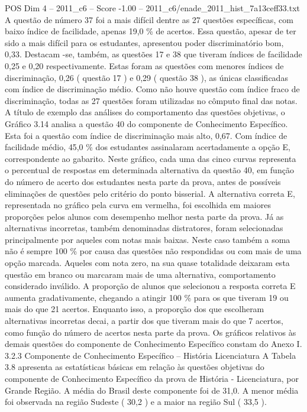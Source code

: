\begin{textsample}{POS Dim 4 – 2011\_c6 – Score -1.00 – 2011\_c6/enade\_2011\_hist\_7a13ceff33.txt}
A questão de número 37 foi a mais difícil dentre as 27 questões específicas, com baixo índice de facilidade, apenas 19,0 \% de acertos.
Essa questão, apesar de ter sido a mais difícil para os estudantes, apresentou poder discriminatório bom, 0,33.
Destacam -se, também, as questões 17 e 38 que tiveram índices de facilidade 0,25 e 0,20 respectivamente.
Estas foram as questões com menores índices de discriminação, 0,26 ( questão 17 ) e 0,29 ( questão 38 ), as únicas classificadas com índice de discriminação médio.
Como não houve questão com índice fraco de discriminação, todas as 27 questões foram utilizadas no cômputo final das notas.
A título de exemplo das análises do comportamento das questões objetivas, o Gráfico 3.14 analisa a questão 40 do componente de Conhecimento Específico.
Esta foi a questão com índice de discriminação mais alto, 0,67.
Com índice de facilidade médio, 45,0 \% dos estudantes assinalaram acertadamente a opção E, correspondente ao gabarito.
Neste gráfico, cada uma das cinco curvas representa o percentual de respostas em determinada alternativa da questão 40, em função do número de acerto dos estudantes nesta parte da prova, antes de possíveis eliminações de questões pelo critério do ponto bisserial.
A alternativa correta E, representada no gráfico pela curva em vermelha, foi escolhida em maiores proporções pelos alunos com desempenho melhor nesta parte da prova.
Já as alternativas incorretas, também denominadas distratores, foram selecionadas principalmente por aqueles com notas mais baixas.
Neste caso também a soma não é sempre 100 \% por causa das questões não respondidas ou com mais de uma opção marcada.
Aqueles com nota zero, na sua quase totalidade deixaram esta questão em branco ou marcaram mais de uma alternativa, comportamento considerado inválido.
A proporção de alunos que selecionou a resposta correta E aumenta gradativamente, chegando a atingir 100 \% para os que tiveram 19 ou mais do que 21 acertos.
Enquanto isso, a proporção dos que escolheram alternativas incorretas decai, a partir dos que tiveram mais do que 7 acertos, como função do número de acertos nesta parte da prova.
Os gráficos relativos às demais questões do componente de Conhecimento Específico constam do Anexo I. 3.2.3 Componente de Conhecimento Específico – História Licenciatura A Tabela 3.8 apresenta as estatísticas básicas em relação às questões objetivas do componente de Conhecimento Específico da prova de História - Licenciatura, por Grande Região.
A média do Brasil deste componente foi de 31,0.
A menor média foi observada na região Sudeste ( 30,2 ) e a maior na região Sul ( 33,5 ).

\end{textsample}
